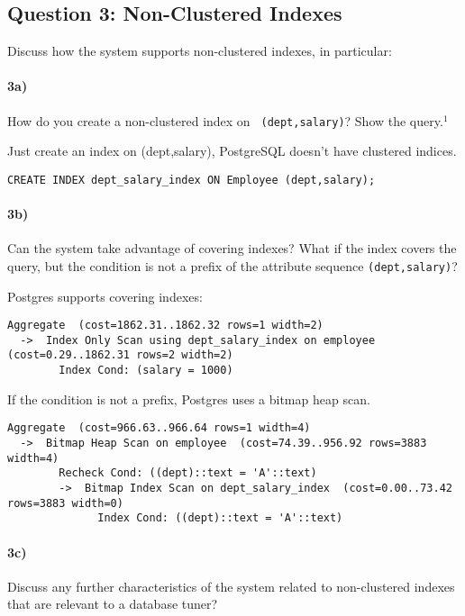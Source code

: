 \documentclass[11pt]{scrartcl}
\begin{document}
\subsection*{Question 3: Non-Clustered Indexes}

Discuss how the system supports non-clustered indexes, in
particular:

\paragraph{3a)} How do you create a non-clustered index on {\tt
  (dept,salary)}? Show the query.$^1$

\vspace{1em}
Just create an index on (dept,salary), PostgreSQL doesn't have clustered indices.

{\small
\begin{verbatim}
CREATE INDEX dept_salary_index ON Employee (dept,salary);
\end{verbatim}
}

\paragraph{3b)} Can the system take advantage of covering indexes? What if the
index covers the query, but the condition is not a prefix of the
attribute sequence {\tt (dept,salary)}?

\vspace{1em}
Postgres supports covering indexes:

{\small
\begin{verbatim}
Aggregate  (cost=1862.31..1862.32 rows=1 width=2)
  ->  Index Only Scan using dept_salary_index on employee  (cost=0.29..1862.31 rows=2 width=2)
        Index Cond: (salary = 1000)
\end{verbatim}
}

If the condition is not a prefix, Postgres uses a bitmap heap scan.

{\small
\begin{verbatim} 
Aggregate  (cost=966.63..966.64 rows=1 width=4)
  ->  Bitmap Heap Scan on employee  (cost=74.39..956.92 rows=3883 width=4)
        Recheck Cond: ((dept)::text = 'A'::text)
        ->  Bitmap Index Scan on dept_salary_index  (cost=0.00..73.42 rows=3883 width=0)
              Index Cond: ((dept)::text = 'A'::text)
\end{verbatim}
}

\paragraph{3c)} Discuss any further characteristics of the system related to
non-clustered indexes that are relevant to a database tuner?
\end{document}
